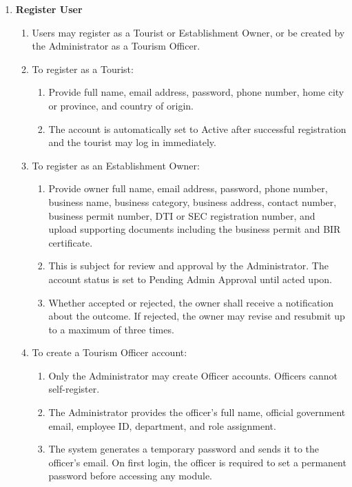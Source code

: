 \documentclass{research}
\begin{document}
\begin{enumerate}
    \item \textbf{Register User}
    \begin{enumerate}
        \item Users may register as a Tourist or Establishment Owner, or be 
        created by the Administrator as a Tourism Officer.
        
        \item To register as a Tourist:
        \begin{enumerate}
            \item Provide full name, email address, password, phone number, 
            home city or province, and country of origin.
            \item The account is automatically set to Active after successful 
            registration and the tourist may log in immediately.
        \end{enumerate}
        
        \item To register as an Establishment Owner:
        \begin{enumerate}
            \item Provide owner full name, email address, password, phone 
            number, business name, business category, business address, 
            contact number, business permit number, DTI or SEC registration 
            number, and upload supporting documents including the business 
            permit and BIR certificate.
            \item This is subject for review and approval by the 
            Administrator. The account status is set to Pending Admin 
            Approval until acted upon.
            \item Whether accepted or rejected, the owner shall receive a 
            notification about the outcome. If rejected, the owner may 
            revise and resubmit up to a maximum of three times.
        \end{enumerate}
        
        \item To create a Tourism Officer account:
        \begin{enumerate}
            \item Only the Administrator may create Officer accounts. 
            Officers cannot self-register.
            \item The Administrator provides the officer's full name, 
            official government email, employee ID, department, and role 
            assignment.
            \item The system generates a temporary password and sends it 
            to the officer's email. On first login, the officer is required 
            to set a permanent password before accessing any module.
        \end{enumerate}
    \end{enumerate}


\end{enumerate}
\end{document}
